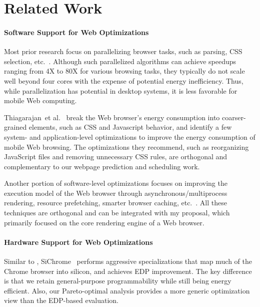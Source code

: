 
\section{Related Work}
\label{sec:related}

\paragraph{Software Support for Web Optimizations} Most prior research focus on parallelizing browser tasks, such as parsing, CSS selection, etc.~\cite{ParallelBrowser, FTL, UCI, Parabix}. Although such parallelized algorithms can achieve speedups ranging from 4X to 80X for various browsing tasks, they typically do not scale well beyond four cores with the expense of potential energy inefficiency. Thus, while parallelization has potential in desktop systems, it is less favorable for mobile Web computing.

Thiagarajan~et al.~\cite{www-battery} break the Web browser's energy consumption into coarser-grained elements, such as CSS and Javascript behavior, and identify a few system- and application-level optimizations to improve the energy consumption of mobile Web browsing.  The optimizations they recommend, such as reorganizing JavaScript files and removing unnecessary CSS rules, are orthogonal and complementary to our webpage prediction and scheduling work.

Another portion of software-level optimizations focuses on improving the execution model of the Web browser through asynchronous/multiprocess rendering, resource prefetching, smarter browser caching, etc.~\cite{pocketweb, Adrenaline, smart-caching, webkit2, firefox-spec_parsing}. All these techniques are orthogonal and can be integrated with my proposal, which primarily focused on the core rendering engine of a Web browser.

\paragraph{Hardware Support for Web Optimizations} Similar to \webcore, SiChrome~\cite{SiChrome} performs aggressive specializations that map much of the Chrome browser into silicon, and achieves EDP improvement. The key difference is that we retain general-purpose programmability while still being energy efficient. Also, our Pareto-optimal analysis provides a more generic optimization view than the EDP-based evaluation.

